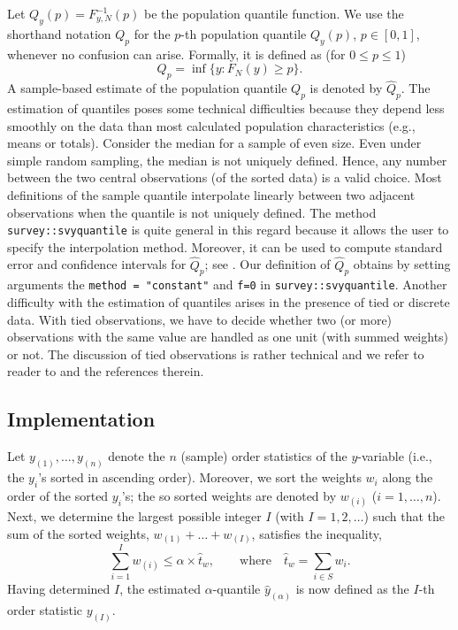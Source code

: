 \documentclass[a4paper,11pt]{scrreprt}
\theoremstyle{remark}
\begin{document}
Let $Q_y(p) = F_{y,N}^{-1}(p)$ be the population quantile function. We use the shorthand notation $Q_p$ for the $p$-th population quantile $Q_y(p)$, $p \in [0,1]$, whenever no confusion can arise. Formally, it is defined as (for $0 \leq p \leq 1$)
\begin{equation*}
   Q_p = \inf \{ y : F_N(y) \geq p \}.
\end{equation*}
\noindent A sample-based estimate of the population quantile $Q_p$ is denoted by $\widehat{Q}_p$. The estimation of quantiles poses some technical difficulties because they depend less smoothly on the data than most calculated population characteristics (e.g., means or totals). Consider the median for a sample of even size. Even under simple random sampling, the median is not uniquely defined. Hence, any number between the two central observations (of the sorted data) is a valid choice. Most definitions of the sample quantile interpolate linearly between two adjacent observations when the quantile is not uniquely defined. The method \texttt{survey::svyquantile} is quite general in this regard because it allows the user to specify the interpolation method. Moreover, it can be used to compute standard error and confidence intervals for $\widehat{Q}_p$; see \citet[][ch. 2.4.1]{lumley2010}. Our definition of $\widehat{Q}_p$ obtains by setting arguments the \texttt{method = "constant"} and \texttt{f=0} in \texttt{survey::svyquantile}. Another difficulty with the estimation of quantiles arises in the presence of tied or discrete data. With tied observations, we have to decide whether two (or more) observations with the same value are handled as one unit (with summed weights) or not. The discussion of tied observations is rather technical and we refer to reader to \citet[][ch. 2.4.1]{lumley2010} and the references therein.

\subsection{Implementation}
Let $y_{(1)}, \ldots, y_{(n)}$ denote the $n$ (sample) order statistics of the $y$-variable (i.e., the $y_i$'s sorted in ascending order). Moreover, we sort the weights $w_i$ along the order of the sorted $y_i$'s; the so sorted weights are denoted by $w_{(i)}$ ($i=1,\ldots,n$). Next, we determine the largest possible integer $I$ (with $I=1,2,\ldots$) such that the sum of the sorted weights, $w_{(1)} + \ldots + w_{(I)}$, satisfies the inequality, 
\begin{equation*}
   \sum_{i=1}^{I} w_{(i)} \leq \alpha \times \hat{t}_w, \qquad \text{where} \quad \hat{t}_w = \sum_{i \in S} w_i. 
\end{equation*}
\noindent Having determined $I$, the estimated $\alpha$-quantile $\hat{y}_{(\alpha)}$ is now defined as the $I$-th order statistic $y_{(I)}$.
\end{document}
